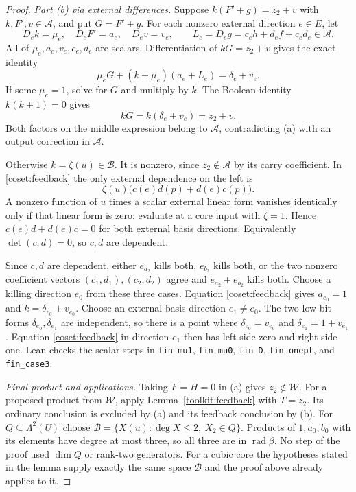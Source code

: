 \documentclass[11pt,a4paper]{article}
\theoremstyle{plain}
\theoremstyle{remark}
\theoremstyle{plain}
\newcommand{\rad}{\operatorname{rad}}
\begin{document}
\begin{proof}
\emph{Part (b) via external differences.} Suppose $k(F'+g)=z_2+v$ with $k,F',v\in\mathcal A$, and put $G=F'+g$. For each nonzero external direction $e\in E$, let
\[
D_ek=\mu_e,\quad D_eF'=a_e,\quad D_ev=v_e,\qquad
L_e=D_eg=c_eh+d_ef+c_ed_e\in\mathcal A.
\]
All of $\mu_e,a_e,v_e,c_e,d_e$ are scalars. Differentiation of $kG=z_2+v$ gives the exact identity
\begin{equation}\label{coset:feedback}
\mu_eG+(k+\mu_e)(a_e+L_e)=\delta_e+v_e.
\end{equation}
If some $\mu_e=1$, solve for $G$ and multiply by $k$. The Boolean identity $k(k+1)=0$ gives
\[
kG=k(\delta_e+v_e)=z_2+v.
\]
Both factors on the middle expression belong to $\mathcal A$, contradicting (a) with an output correction in $\mathcal A$.

Otherwise $k=\zeta(u)\in\mathcal B$. It is nonzero, since $z_2\notin\mathcal A$ by its carry coefficient. In \eqref{coset:feedback} the only external dependence on the left is
\[
\zeta(u)\bigl(c(e)d(p)+d(e)c(p)\bigr).
\]
A nonzero function of $u$ times a scalar external linear form vanishes identically only if that linear form is zero: evaluate at a core input with $\zeta=1$. Hence $c(e)d+d(e)c=0$ for both external basis directions. Equivalently $\det(c,d)=0$, so $c,d$ are dependent.

Since $c,d$ are dependent, either $e_{a_2}$ kills both, $e_{b_2}$ kills both, or the two nonzero coefficient vectors $(c_1,d_1),(c_2,d_2)$ agree and $e_{a_2}+e_{b_2}$ kills both. Choose a killing direction $e_0$ from these three cases. Equation \eqref{coset:feedback} gives $a_{e_0}=1$ and $k=\delta_{e_0}+v_{e_0}$. Choose an external basis direction $e_1\ne e_0$. The two low-bit forms $\delta_{e_0},\delta_{e_1}$ are independent, so there is a point where $\delta_{e_0}=v_{e_0}$ and $\delta_{e_1}=1+v_{e_1}$. Equation \eqref{coset:feedback} in direction $e_1$ then has left side zero and right side one. Lean checks the scalar steps in \nolinkurl{fin_mu1}, \nolinkurl{fin_mu0}, \nolinkurl{fin_D}, \nolinkurl{fin_onept}, and \nolinkurl{fin_case3}.

\emph{Final product and applications.} Taking $F=H=0$ in (a) gives $z_2\notin\mathcal W$. For a proposed product from $\mathcal W$, apply Lemma~\ref{toolkit:feedback} with $T=z_2$. Its ordinary conclusion is excluded by (a) and its feedback conclusion by (b).
For $Q\subseteq\Lambda^2(U)$ choose $\mathcal B=\{X(u):\deg X\le2,\ X_2\in Q\}$. Products of $1,a_0,b_0$ with its elements have degree at most three, so all three are in $\rad\beta$. No step of the proof used $\dim Q$ or rank-two generators. For a cubic core the hypotheses stated in the lemma supply exactly the same space $\mathcal B$ and the proof above already applies to it.
\end{proof}
\end{document}
